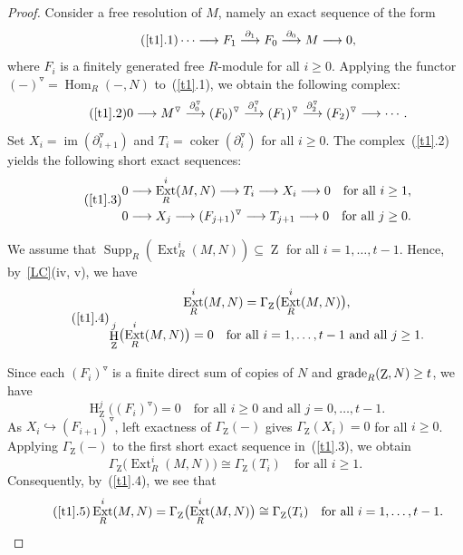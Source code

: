 \documentclass[11pt]{amsart}
\theoremstyle{definition}
\theoremstyle{definition}
\numberwithin{equation}{section}
\DeclareMathOperator{\gr}{\textnormal{grade}}
\DeclareMathOperator{\mz}{Z}
\DeclareMathOperator{\coker}{coker}
\DeclareMathOperator{\Ext}{Ext}
\DeclareMathOperator{\hh}{H}
\DeclareMathOperator{\Hom}{Hom}
\DeclareMathOperator{\im}{im}
\DeclareMathOperator{\Supp}{Supp}
\begin{document}
\begin{proof}
Consider a free resolution of $M$, namely an exact sequence
of the form
\[
\tag{\ref{t1}.1}
\cdots\longrightarrow F_1
\overset{\partial_1}{\longrightarrow}F_0
\overset{\partial_0}{\longrightarrow}M
\longrightarrow0,
\]
where $F_i$ is a finitely generated free $R$-module for all
$i\geq0$. Applying the functor
$(-)^{\triangledown}=\Hom_R(-,N)$
to~(\ref{t1}.1), we obtain the following complex:
\[
\tag{\ref{t1}.2}
0\longrightarrow M^{\triangledown}
\overset{\partial_0^{\triangledown}}{\longrightarrow}
(F_0)^{\triangledown}
\overset{\partial_1^{\triangledown}}{\longrightarrow}
(F_1)^{\triangledown}
\overset{\partial_2^{\triangledown}}{\longrightarrow}
(F_2)^{\triangledown}
\longrightarrow\cdots.
\]
Set
$X_i=\im(\partial_{i+1}^{\triangledown})$
and
$T_i=\coker(\partial_i^{\triangledown})$
for all $i\geq0$. The complex~(\ref{t1}.2) yields the
following short exact sequences:
\[
\tag{\ref{t1}.3}
\begin{gathered}
0\longrightarrow\Ext^i_R(M,N)
\longrightarrow T_i
\longrightarrow X_i
\longrightarrow0
\quad\text{for all }i\geq1,\\
0\longrightarrow X_j
\longrightarrow(F_{j+1})^{\triangledown}
\longrightarrow T_{j+1}
\longrightarrow0
\quad\text{for all }j\geq0.
\end{gathered}
\]

We assume that
$\Supp_R(\Ext^i_R(M,N))\subseteq\mz$
for all $i=1,\ldots,t-1$.
Hence, by~\ref{LC}(iv, v), we have
\[
\tag{\ref{t1}.4}
\begin{gathered}
\Ext^i_R(M,N)
=\Gamma_{\mz}\bigl(\Ext^i_R(M,N)\bigr),\\
\hh^j_{\mz}\bigl(\Ext^i_R(M,N)\bigr)=0
\quad\text{for all }i=1,\ldots,t-1
\text{ and all }j\geq1.
\end{gathered}
\]

Since each $(F_i)^{\triangledown}$ is a finite direct sum
of copies of $N$ and $\gr_R(\mz,N)\geq t$, we have
\[
\hh^j_{\mz}\bigl((F_i)^{\triangledown}\bigr)=0
\quad\text{for all }i\geq0
\text{ and all }j=0,\ldots,t-1.
\]
As $X_i\hookrightarrow(F_{i+1})^{\triangledown}$,
left exactness of $\Gamma_{\mz}(-)$ gives
$\Gamma_{\mz}(X_i)=0$ for all $i\geq0$.
Applying $\Gamma_{\mz}(-)$ to the first short exact sequence
in~(\ref{t1}.3), we obtain
\[
\Gamma_{\mz}\bigl(\Ext^i_R(M,N)\bigr)
\cong\Gamma_{\mz}(T_i)
\quad\text{for all }i\geq1.
\]
Consequently, by~(\ref{t1}.4), we see that
\[
\tag{\ref{t1}.5}
\Ext^i_R(M,N)
=\Gamma_{\mz}\bigl(\Ext^i_R(M,N)\bigr)
\cong\Gamma_{\mz}(T_i)
\quad\text{for all }i=1,\ldots,t-1.
\]


\end{proof}
\end{document}
